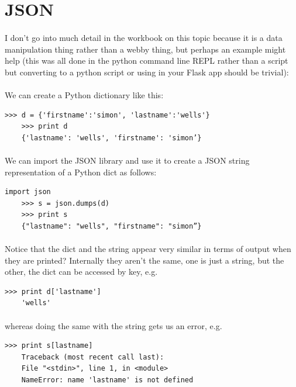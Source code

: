 \documentclass[12pt, a4paper, oneside]{book}
\begin{document}
{\section{JSON}
\label{json}
\paragraph{} I don’t go into much detail in the workbook on this topic because it is a data manipulation thing rather than a webby thing, but perhaps an example might help (this was all done in the python command line REPL rather than a script but converting to a python script or using in your Flask app should be trivial):

\paragraph{} We can create a Python dictionary like this:
\begin{lstlisting}[style=DOS]
    >>> d = {'firstname':'simon', 'lastname':'wells'}
    >>> print d
    {'lastname': 'wells', 'firstname': 'simon’}
\end{lstlisting}

\paragraph{} We can import the JSON library and use it to create a JSON string representation of a Python dict as follows:
\begin{lstlisting}[style=DOS]
import json
    >>> s = json.dumps(d)
    >>> print s
    {"lastname": "wells", "firstname": "simon”}
\end{lstlisting}

\paragraph{} Notice that the dict and the string appear very similar in terms of output when they are printed? Internally they aren’t the same, one is just a string, but the other, the dict can be accessed by key, e.g.
\begin{lstlisting}[style=DOS]
    >>> print d['lastname']
    'wells'
\end{lstlisting}

\paragraph{} whereas doing the same with the string gets us an error, e.g.
\begin{lstlisting}[style=DOS]
    >>> print s[lastname]
    Traceback (most recent call last):
    File "<stdin>", line 1, in <module>
    NameError: name 'lastname' is not defined
\end{lstlisting}

}
\end{document}
